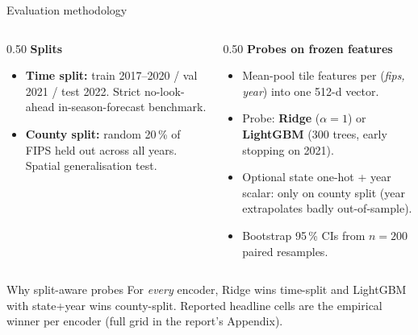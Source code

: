 \documentclass[aspectratio=169,11pt]{beamer}
\begin{document}
\begin{frame}{Evaluation methodology}
  \begin{columns}[T]
    \begin{column}{0.50\textwidth}
      \textbf{Splits}
      \begin{itemize}\small\setlength\itemsep{3pt}
        \item \textbf{Time split:} train 2017--2020 / val 2021 /
              test 2022. Strict no-look-ahead in-season-forecast benchmark.
        \item \textbf{County split:} random 20\,\% of FIPS held out across
              all years. Spatial generalisation test.
      \end{itemize}
    \end{column}
    \begin{column}{0.50\textwidth}
      \textbf{Probes on frozen features}
      \begin{itemize}\small\setlength\itemsep{3pt}
        \item Mean-pool tile features per (\textit{fips, year}) into one
              512-d vector.
        \item Probe: \textbf{Ridge} ($\alpha\!=\!1$) or \textbf{LightGBM}
              (300 trees, early stopping on 2021).
        \item Optional state one-hot + year scalar: only on county split
              (year extrapolates badly out-of-sample).
        \item Bootstrap 95\,\% CIs from $n\!=\!200$ paired resamples.
      \end{itemize}
    \end{column}
  \end{columns}

  \vspace{4pt}
  \begin{block}{Why split-aware probes}
    For \emph{every} encoder, Ridge wins time-split and LightGBM with state+year
    wins county-split. Reported headline cells are the empirical winner per
    encoder (full grid in the report's Appendix).
  \end{block}
\end{frame}
\end{document}
